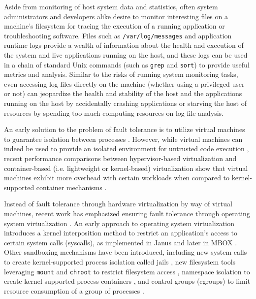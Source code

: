 \documentclass{proc}
\begin{document}
Aside from monitoring of host system data and statistics, often system administrators and developers alike desire to monitor interesting files on a machine's filesystem for tracing the execution of a running application or troubleshooting software. Files such as \texttt{/var/log/messages} and application runtime logs provide a wealth of information about the health and execution of the system and live applications running on the host, and these logs can be used in a chain of standard Unix commands (such as \texttt{grep} and \texttt{sort}) to provide useful metrics and analysis. Similar to the risks of running system monitoring tasks, even accessing log files directly on the machine (whether using a privileged user or not) can jeopardize the health and stability of the host and the applications running on the host by accidentally crashing applications or starving the host of resources by spending too much computing resources on log file analysis.

An early solution to the problem of fault tolerance is to utilize virtual machines to guarantee isolation between processes \cite{garfinkel2003terra}. However, while virtual machines can indeed be used to provide an isolated environment for untrusted code execution \cite{wen2012virtualization}, recent performance comparisons between hypervisor-based virtualization and container-based (i.e. lightweight or kernel-based) virtualization show that virtual machines exhibit more overhead with certain workloads when compared to kernel-supported container mechanisms \cite{felter2014docker, morabito2015hypervisors}.

Instead of fault tolerance through hardware virtualization by way of virtual machines, recent work has emphasized ensuring fault tolerance through operating system virtualization \cite{soltesz2007container}. An early approach to operating system virtualization introduces a kernel interposition method to restrict an application's access to certain system calls (syscalls), as implemented in Janus \cite{goldberg1996janus} and later in MBOX \cite{kim2013mbox}. Other sandboxing mechanisms have been introduced, including new system calls to create kernel-supported process isolation called jails \cite{kamp2000jails}, new filesystem tools leveraging \texttt{mount} and \texttt{chroot} to restrict filesystem access \cite{prevelakis2001fmac}, namespace isolation to create kernel-supported process containers \cite{biederman2006namespaces, menage2007containers}, and control groups (cgroups) to limit resource consumption of a group of processes \cite{menagecgroups}.
\end{document}
